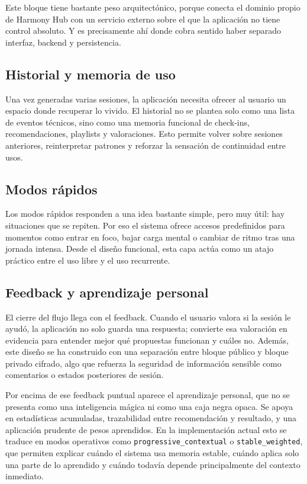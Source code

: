 Este bloque tiene bastante peso arquitectónico, porque conecta el dominio
propio de Harmony Hub con un servicio externo sobre el que la aplicación no
tiene control absoluto. Y es precisamente ahí donde cobra sentido haber
separado interfaz, backend y persistencia.

\subsection{Historial y memoria de uso}

Una vez generadas varias sesiones, la aplicación necesita ofrecer al usuario un
espacio donde recuperar lo vivido. El historial no se plantea solo como una
lista de eventos técnicos, sino como una memoria funcional de check-ins,
recomendaciones, playlists y valoraciones. Esto permite volver sobre sesiones
anteriores, reinterpretar patrones y reforzar la sensación de continuidad entre
usos.

\subsection{Modos rápidos}

Los modos rápidos responden a una idea bastante simple, pero muy útil: hay
situaciones que se repiten. Por eso el sistema ofrece accesos predefinidos para
momentos como entrar en foco, bajar carga mental o cambiar de ritmo tras una
jornada intensa. Desde el diseño funcional, esta capa actúa como un atajo
práctico entre el uso libre y el uso recurrente.

\subsection{Feedback y aprendizaje personal}

El cierre del flujo llega con el feedback. Cuando el usuario valora si la
sesión le ayudó, la aplicación no solo guarda una respuesta; convierte esa
valoración en evidencia para entender mejor qué propuestas funcionan y cuáles
no. Además, este diseño se ha construido con una separación entre bloque
público y bloque privado cifrado, algo que refuerza la seguridad de información
sensible como comentarios o estados posteriores de sesión.

Por encima de ese feedback puntual aparece el aprendizaje personal, que no se
presenta como una inteligencia mágica ni como una caja negra opaca. Se apoya en
estadísticas acumuladas, trazabilidad entre recomendación y resultado, y una
aplicación prudente de pesos aprendidos. En la implementación actual esto se traduce en
modos operativos como \texttt{progressive\_contextual} o
\texttt{stable\_weighted}, que permiten explicar cuándo el sistema usa memoria
estable, cuándo aplica solo una parte de lo aprendido y cuándo todavía depende
principalmente del contexto inmediato.

